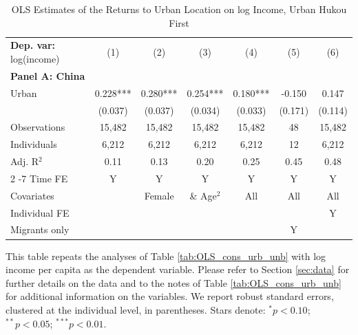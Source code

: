 \begin{table}[htbp] \centering \begin{threeparttable}
 \caption{OLS Estimates of the Returns to Urban Location on log Income, Urban Hukou First} 
 \label{tab:OLS_CHN_hukou_urban_first_income_urban_unb} 
\begin{tabular}{l cccccc} \toprule  \textbf{Dep. var:}  log(income) 
                    &\multicolumn{1}{c}{(1)}   &\multicolumn{1}{c}{(2)}   &\multicolumn{1}{c}{(3)}   &\multicolumn{1}{c}{(4)}   &\multicolumn{1}{c}{(5)}   &\multicolumn{1}{c}{(6)}   \\
\textbf{Panel A: China} \\
Urban               &       0.228***&       0.280***&       0.254***&       0.180***&      -0.150   &       0.147   \\
                    &     (0.037)   &     (0.037)   &     (0.034)   &     (0.033)   &     (0.171)   &     (0.114)   \\
\addlinespace
Observations        &      15,482   &      15,482   &      15,482   &      15,482   &          48   &      15,482   \\
Individuals         &       6,212   &       6,212   &       6,212   &       6,212   &          12   &       6,212   \\
Adj. R$^{2}$        &        0.11   &        0.13   &        0.20   &        0.25   &        0.45   &        0.48   \\
\cmidrule{2 -7} Time FE & Y & Y & Y & Y & Y & Y \\ Covariates & & Female & \& Age$^2$ & All & All & All \\ Individual FE & & & & & & Y \\ Migrants only & & & & & Y & \\ \bottomrule \end{tabular} \begin{tablenotes}[flushleft] \footnotesize \item{This table repeats the analyses of Table \ref{tab:OLS_cons_urb_unb} with log income per capita as the dependent variable. Please refer to Section \ref{sec:data} for further details on the data and to the notes of Table \ref{tab:OLS_cons_urb_unb} for additional information on the variables. We report robust standard errors, clustered at the individual level, in parentheses. Stars denote: $^{*} p<0.10$; $^{**} p<0.05$; $^{***} p<0.01$.} \end{tablenotes} \end{threeparttable} \end{table}
